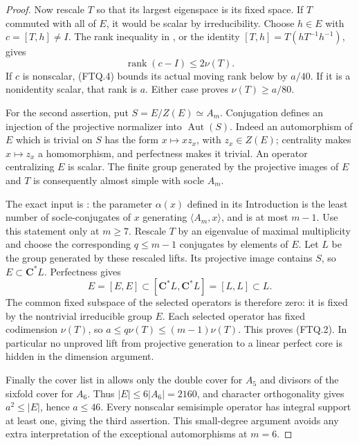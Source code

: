 \begin{proof}
Now rescale \(T\) so that its largest eigenspace is its fixed
space.  If \(T\) commuted with all of \(E\), it would be scalar
by irreducibility.  Choose \(h\in E\) with \(c=[T,h]\ne I\).
The rank inequality in \cite[Lemma~3.1, p.~139]{BI:DHP}, or the
identity \([T,h]=T(hT^{-1}h^{-1})\), gives
\[
             \operatorname{rank}(c-I)\le2\nu(T).
 \tag{FTQ.5}
\]
If \(c\) is nonscalar, (FTQ.4) bounds its actual moving rank
below by \(a/40\).  If it is a nonidentity scalar, that rank is
\(a\).  Either case proves \(\nu(T)\ge a/80\).

For the second assertion, put \(S=E/Z(E)\simeq A_m\).
Conjugation defines an injection of the projective normalizer into
\(\operatorname{Aut}(S)\).  Indeed an automorphism of \(E\) which
is trivial on \(S\) has the form \(x\mapsto xz_x\), with
\(z_x\in Z(E)\); centrality makes \(x\mapsto z_x\) a
homomorphism, and perfectness makes it trivial.  An operator
centralizing \(E\) is scalar.  The finite group generated by the
projective images of \(E\) and \(T\) is consequently almost simple
with socle \(A_m\).

The exact input is \cite[Lemma~6.1, pp.~547--548]{BI:GS}:
the parameter \(\alpha(x)\) defined in its Introduction is the
least number of socle-conjugates of \(x\) generating
\(\langle A_m,x\rangle\), and is at most \(m-1\).
Use this statement only at \(m\ge7\).  Rescale \(T\) by an
eigenvalue of maximal multiplicity and choose the corresponding
\(q\le m-1\) conjugates by elements of \(E\).  Let \(L\) be
the group generated by these rescaled lifts.  Its projective image
contains \(S\), so \(E\subset\mathbf C^*L\).  Perfectness gives
\[
            E=[E,E]\subset[\mathbf C^*L,\mathbf C^*L]
                           =[L,L]\subset L.
 \tag{FTQ.6}
\]
The common fixed subspace of the selected operators is therefore
zero: it is fixed by the nontrivial irreducible group \(E\).
Each selected operator has fixed codimension \(\nu(T)\), so
\(a\le q\nu(T)\le(m-1)\nu(T)\).  This proves (FTQ.2).
In particular no unproved lift from projective generation to a
linear perfect core is hidden in the dimension argument.

Finally the cover list in \cite[Chapter~4 opening, p.~31]{BI:HHM}
allows only the double cover for \(A_5\) and divisors of the
sixfold cover for \(A_6\).  Thus \(|E|\le6|A_6|=2160\), and
character orthogonality gives \(a^2\le|E|\), hence \(a\le46\).
Every nonscalar semisimple operator has integral support at least
one, giving the third assertion.  This small-degree argument avoids
any extra interpretation of the exceptional automorphisms at
\(m=6\).
\end{proof}

